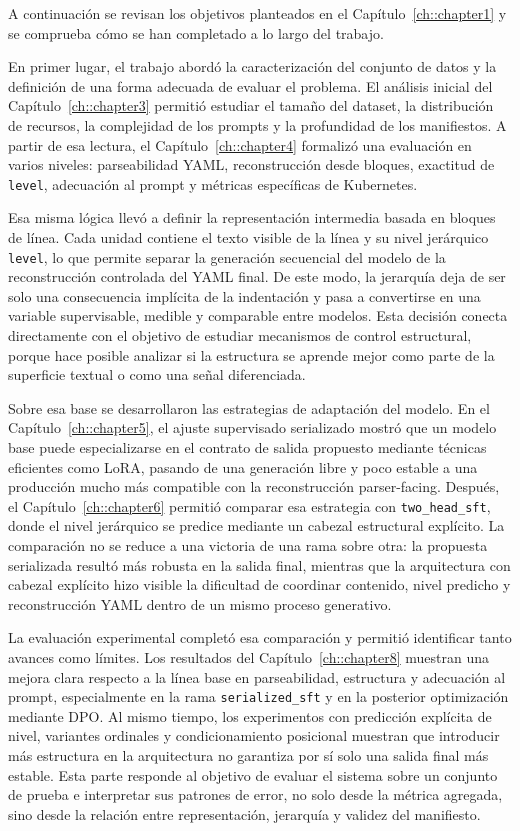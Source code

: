 A continuación se revisan los objetivos planteados en el Capítulo~\ref{ch::chapter1} y se comprueba cómo se han completado a lo largo
del trabajo.

En primer lugar, el trabajo abordó la caracterización del conjunto de datos y la definición de una forma adecuada de evaluar el problema.
El análisis inicial del Capítulo~\ref{ch::chapter3} permitió estudiar el tamaño del dataset, la distribución de recursos, la complejidad
de los prompts y la profundidad de los manifiestos. A partir de esa lectura, el Capítulo~\ref{ch::chapter4} formalizó una evaluación en
varios niveles: parseabilidad YAML, reconstrucción desde bloques, exactitud de \texttt{level}, adecuación al prompt y métricas específicas
de Kubernetes.

Esa misma lógica llevó a definir la representación intermedia basada en bloques de línea. Cada unidad contiene el texto visible de la
línea y su nivel jerárquico \texttt{level}, lo que permite separar la generación secuencial del modelo de la reconstrucción controlada
del YAML final. De este modo, la jerarquía deja de ser solo una consecuencia implícita de la indentación y pasa a convertirse en una
variable supervisable, medible y comparable entre modelos. Esta decisión conecta directamente con el objetivo de estudiar mecanismos
de control estructural, porque hace posible analizar si la estructura se aprende mejor como parte de la superficie textual o como
una señal diferenciada.

Sobre esa base se desarrollaron las estrategias de adaptación del modelo. En el Capítulo~\ref{ch::chapter5}, el ajuste supervisado
serializado mostró que un modelo base puede especializarse en el contrato de salida propuesto mediante técnicas eficientes como
LoRA, pasando de una generación libre y poco estable a una producción mucho más compatible con la reconstrucción parser-facing.
Después, el Capítulo~\ref{ch::chapter6} permitió comparar esa estrategia con \texttt{two\_head\_sft}, donde el nivel jerárquico
se predice mediante un cabezal estructural explícito. La comparación no se reduce a una victoria de una rama sobre otra: la
propuesta serializada resultó más robusta en la salida final, mientras que la arquitectura con cabezal explícito hizo visible
la dificultad de coordinar contenido, nivel predicho y reconstrucción YAML dentro de un mismo proceso generativo.

La evaluación experimental completó esa comparación y permitió identificar tanto avances como límites. Los resultados del
Capítulo~\ref{ch::chapter8} muestran una mejora clara respecto a la línea base en parseabilidad, estructura y adecuación al
prompt, especialmente en la rama \texttt{serialized\_sft} y en la posterior optimización mediante DPO. Al mismo tiempo, los
experimentos con predicción explícita de nivel, variantes ordinales y condicionamiento posicional muestran que introducir más
estructura en la arquitectura no garantiza por sí solo una salida final más estable. Esta parte responde al objetivo de evaluar
el sistema sobre un conjunto de prueba e interpretar sus patrones de error, no solo desde la métrica agregada, sino desde la
relación entre representación, jerarquía y validez del manifiesto.

